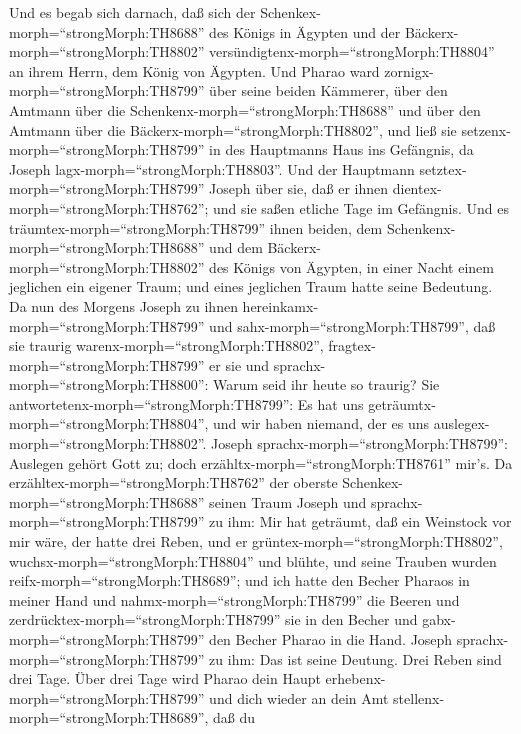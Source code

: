  Und es begab sich darnach, daß sich der
Schenkex-morph=``strongMorph:TH8688'' des Königs in Ägypten und der
Bäckerx-morph=``strongMorph:TH8802''
versündigtenx-morph=``strongMorph:TH8804'' an ihrem Herrn, dem König von
Ägypten.  Und Pharao ward
zornigx-morph=``strongMorph:TH8799'' über seine beiden Kämmerer, über
den Amtmann über die Schenkenx-morph=``strongMorph:TH8688'' und über den
Amtmann über die Bäckerx-morph=``strongMorph:TH8802'',  und
ließ sie setzenx-morph=``strongMorph:TH8799'' in des Hauptmanns Haus ins
Gefängnis, da Joseph lagx-morph=``strongMorph:TH8803''.  Und
der Hauptmann setztex-morph=``strongMorph:TH8799'' Joseph über sie, daß
er ihnen dientex-morph=``strongMorph:TH8762''; und sie saßen etliche
Tage im Gefängnis.  Und es
träumtex-morph=``strongMorph:TH8799'' ihnen beiden, dem
Schenkenx-morph=``strongMorph:TH8688'' und dem
Bäckerx-morph=``strongMorph:TH8802'' des Königs von Ägypten, in einer
Nacht einem jeglichen ein eigener Traum; und eines jeglichen Traum hatte
seine Bedeutung.  Da nun des Morgens Joseph zu ihnen
hereinkamx-morph=``strongMorph:TH8799'' und
sahx-morph=``strongMorph:TH8799'', daß sie traurig
warenx-morph=``strongMorph:TH8802'', 
fragtex-morph=``strongMorph:TH8799'' er sie und
sprachx-morph=``strongMorph:TH8800'': Warum seid ihr heute so traurig?
 Sie antwortetenx-morph=``strongMorph:TH8799'': Es hat uns
geträumtx-morph=``strongMorph:TH8804'', und wir haben niemand, der es
uns auslegex-morph=``strongMorph:TH8802''. Joseph
sprachx-morph=``strongMorph:TH8799'': Auslegen gehört Gott zu; doch
erzähltx-morph=``strongMorph:TH8761'' mir's.  Da
erzähltex-morph=``strongMorph:TH8762'' der oberste
Schenkex-morph=``strongMorph:TH8688'' seinen Traum Joseph und
sprachx-morph=``strongMorph:TH8799'' zu ihm: Mir hat geträumt, daß ein
Weinstock vor mir wäre,  der hatte drei Reben, und er
grüntex-morph=``strongMorph:TH8802'',
wuchsx-morph=``strongMorph:TH8804'' und blühte, und seine Trauben wurden
reifx-morph=``strongMorph:TH8689'';  und ich hatte den
Becher Pharaos in meiner Hand und nahmx-morph=``strongMorph:TH8799'' die
Beeren und zerdrücktex-morph=``strongMorph:TH8799'' sie in den Becher
und gabx-morph=``strongMorph:TH8799'' den Becher Pharao in die Hand.
 Joseph sprachx-morph=``strongMorph:TH8799'' zu ihm: Das
ist seine Deutung. Drei Reben sind drei Tage.  Über drei
Tage wird Pharao dein Haupt erhebenx-morph=``strongMorph:TH8799'' und
dich wieder an dein Amt stellenx-morph=``strongMorph:TH8689'', daß du
